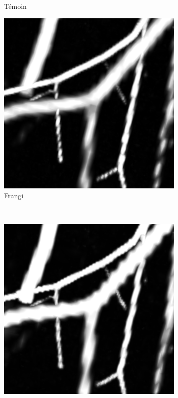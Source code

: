 \begin{figure}[!ht]
\begin{subfigure}[t]{0.30\textwidth}
      \caption{Témoin}
    \end{subfigure}
    \begin{subfigure}[t]{0.30\textwidth}
      \includegraphics[clip = true, trim  =  170 230 150 240, width=\textwidth]{Images/Vascu_2_k_Frangi.png}
      \caption{Frangi}
    \end{subfigure}
    \\
    \begin{subfigure}[t]{0.30\textwidth}
      \includegraphics[clip = true, trim  =  170 230 150 240, width=\textwidth]{Images/Vascu_2_k_Jerman.png}

\end{subfigure}
\end{figure}
